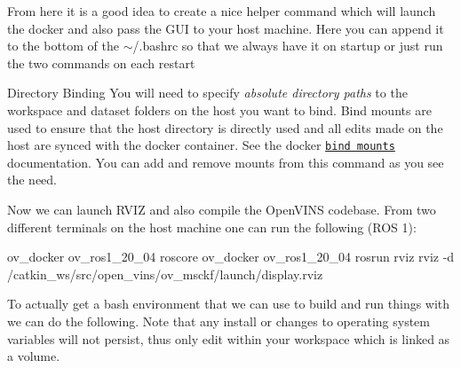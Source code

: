 From here it is a good idea to create a nice helper command which will launch the docker and also pass the G\+UI to your host machine. Here you can append it to the bottom of the $\sim$/.bashrc so that we always have it on startup or just run the two commands on each restart



\begin{DoxyParagraph}{Directory Binding}
You will need to specify {\itshape absolute directory paths} to the workspace and dataset folders on the host you want to bind. Bind mounts are used to ensure that the host directory is directly used and all edits made on the host are sync\textquotesingle{}ed with the docker container. See the docker \href{https://docs.docker.com/storage/bind-mounts/}{\tt bind mounts} documentation. You can add and remove mounts from this command as you see the need.
\end{DoxyParagraph}



Now we can launch R\+V\+IZ and also compile the Open\+V\+I\+NS codebase. From two different terminals on the host machine one can run the following (R\+OS 1)\+:


\begin{DoxyCode}
ov\_docker ov\_ros1\_20\_04 roscore
ov\_docker ov\_ros1\_20\_04 rosrun rviz rviz -d /catkin\_ws/src/open\_vins/ov\_msckf/launch/display.rviz
\end{DoxyCode}


To actually get a bash environment that we can use to build and run things with we can do the following. Note that any install or changes to operating system variables will not persist, thus only edit within your workspace which is linked as a volume.


